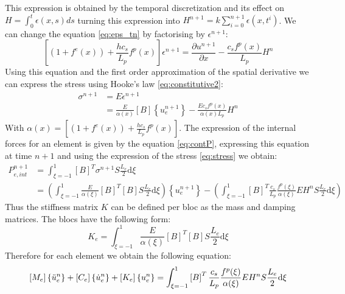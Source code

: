 This expression is obtained by the temporal discretization and its effect on $H = \int_0^t \epsilon(x,s)ds $ turning this expression into $H^{n+1} = k \sum_{i=0}^{n+1} \epsilon(x,t^{i})$. We can change the equation \ref{eq:eps_tn} by factorising by $\epsilon^{n+1}$:
\begin{equation}
    \left[(1+f^e(x)) + \frac{h c_s}{L_p} f^p(x)   \right]\epsilon^{n+1} = \frac{\partial u^{n+1}}{\partial x} -\frac{c_s f^p(x)}{L_p}H^{n}
\end{equation}
Using this equation and the first order approximation of the spatial derivative we can express the stress using Hooke's law \ref{eq:constitutive2}:
\begin{equation}
\begin{aligned}
    \sigma^{n+1} &= E \epsilon^{n+1} \\
    &= \frac{E}{\alpha(x)}\left[B\right]\left\{u^{n+1}_e\right\}  -\frac{E c_s f^p(x)}{\alpha(x)L_p}H^{n}
\end{aligned}
\label{eq:stress}
\end{equation}
With $\alpha(x)= \left[(1+f^e(x)) + \frac{h c_s}{L_p} f^p(x)   \right]$.
The expression of the internal forces for an element is given by the equation \ref{eq:contP}, expressing this equation at time $n+1$ and using the expression of the stress \ref{eq:stress} we obtain:
\begin{equation}
\begin{aligned}
    P_{e,int}^{n+1} &=  \int^1_{\xi=-1} \left[B \right]^T \sigma^{n+1} S \frac{L_e}{2}\mathrm{d} \xi \\ &= \left(\int^1_{\xi=-1} \frac{E}{\alpha(\xi)}  \left[B \right]^T\left[B \right] S \frac{L_e}{2}\mathrm{d} \xi\right) \left\{u^{n+1}_e\right\} - \left(\int^1_{\xi=-1}   \left[B \right]^T \frac{c_s}{L_p} \frac{f^p(\xi)}{\alpha(\xi)} E H^n S \frac{L_e}{2} \mathrm{d} \xi\right)
    \end{aligned}
\end{equation}
Thus the stiffness matrix $K$ can be defined per bloc as the mass and damping matrices. The blocs have the following form:
\begin{equation}
    K_e = \int^1_{\xi=-1}  \frac{E}{\alpha(\xi)}  \left[B \right]^T\left[B \right] S \frac{L_e}{2}    \mathrm{d} \xi
    \label{eq:Ke}
\end{equation}
Therefore for each element we obtain the following equation:
\begin{equation}
    \left[M_e\right]\left\{\Ddot{u}_e^n\right\} + \left[C_e\right] \left\{\Dot{u}_e^n\right\}+ \left[K_e\right] \left\{u_e^n\right\} = \int^1_{\xi=-1}   \left[B \right]^T \frac{c_s}{L_p} \frac{f^p(\xi)}{\alpha(\xi)} E H^n S \frac{L_e}{2} \mathrm{d} \xi
\end{equation}
